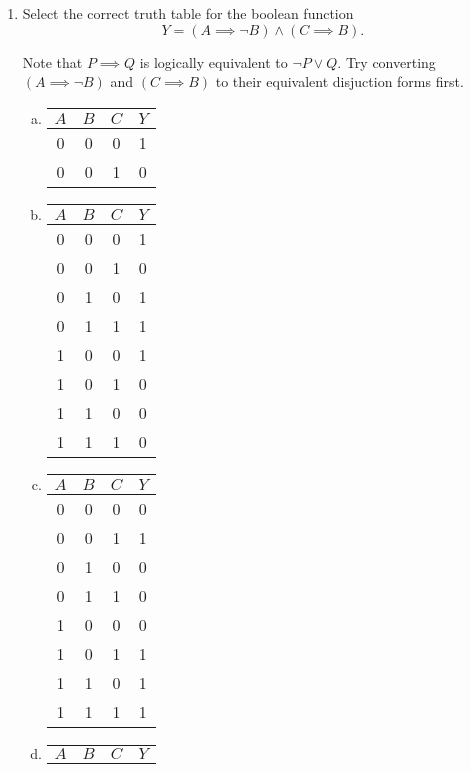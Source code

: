 \documentclass[11pt, preview]{standalone} %
\begin{document}
\begin{enumerate}
\item Select the correct truth table for the boolean function
\begin{equation*}
Y = (A \implies \lnot B) \land (C \implies B).
\end{equation*}
\begin{Choices}
  \Hint Note that $P \implies Q$ is logically equivalent to 
  $\lnot P \lor Q$. Try converting $(A \implies \lnot B)$ 
  and $(C \implies B)$ to their equivalent disjuction forms
  first.
  \begin{enumerate}[(a)]
    \FalseChoice\item \begin{tabular}{ c | c | c || c }
      $A$ & $B$ & $C$ & $Y$ \\
      \hline
      0 & 0 & 0 & 1 \\
      0 & 0 & 1 & 0
    \end{tabular}
    \TrueChoice\item \begin{tabular}{ c | c | c || c }
      $A$ & $B$ & $C$ & $Y$ \\
      \hline
      0 & 0 & 0 & 1 \\
      0 & 0 & 1 & 0 \\
      0 & 1 & 0 & 1 \\
      0 & 1 & 1 & 1 \\
      1 & 0 & 0 & 1 \\
      1 & 0 & 1 & 0 \\
      1 & 1 & 0 & 0 \\
      1 & 1 & 1 & 0 
    \end{tabular}
    \FalseChoice\item \begin{tabular}{ c | c | c || c }
      $A$ & $B$ & $C$ & $Y$ \\
      \hline
      0 & 0 & 0 & 0 \\
      0 & 0 & 1 & 1 \\
      0 & 1 & 0 & 0 \\
      0 & 1 & 1 & 0 \\
      1 & 0 & 0 & 0 \\
      1 & 0 & 1 & 1 \\
      1 & 1 & 0 & 1 \\
      1 & 1 & 1 & 1 
    \end{tabular}
    \FalseChoice\item \begin{tabular}{ c | c | c || c }
      $A$ & $B$ & $C$ & $Y$ \\

\end{tabular}
\end{enumerate}
\end{Choices}
\end{enumerate}
\end{document}
